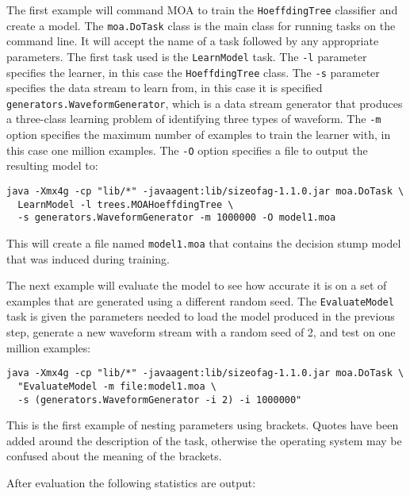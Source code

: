 \documentclass[a4paper,12pt,twoside]{book}
\begin{document}
The first example will command MOA to train the \verb+HoeffdingTree+ classifier and create a model. The \verb+moa.DoTask+ class is the main class for running tasks on the command line. It will accept the name of a task followed by any appropriate parameters. The first task used is the \verb+LearnModel+ task. The \verb+-l+ parameter specifies the learner, in this case the \verb+HoeffdingTree+ class. The \verb+-s+ parameter specifies the data stream to learn from, in this case it is
specified  \verb+generators.WaveformGenerator+, which is a data stream generator that produces a three-class learning problem of identifying three types of waveform. The \verb+-m+ option specifies the maximum number of examples to train the learner with, in this case one million examples. The \verb+-O+ option specifies a file to output the resulting model to:

\begin{footnotesize}\begin{verbatim}
java -Xmx4g -cp "lib/*" -javaagent:lib/sizeofag-1.1.0.jar moa.DoTask \
  LearnModel -l trees.MOAHoeffdingTree \
  -s generators.WaveformGenerator -m 1000000 -O model1.moa
\end{verbatim}\end{footnotesize}

This will create a file named \verb+model1.moa+ that contains the decision stump model that was induced during training.

The next example will evaluate the model to see how accurate it is on a set of examples that are generated using a different random seed. The \verb+EvaluateModel+ task is given the parameters needed to load the model produced in the previous step, generate a new waveform stream with a random seed of 2, and test on one million examples:

\begin{footnotesize}\begin{verbatim}
java -Xmx4g -cp "lib/*" -javaagent:lib/sizeofag-1.1.0.jar moa.DoTask \
  "EvaluateModel -m file:model1.moa \
  -s (generators.WaveformGenerator -i 2) -i 1000000"
\end{verbatim}\end{footnotesize}

This is the first example of nesting parameters using brackets. Quotes have been added around the description of the task, otherwise the operating system may be confused about the meaning of the brackets.

After evaluation the following statistics are output:
\end{document}
